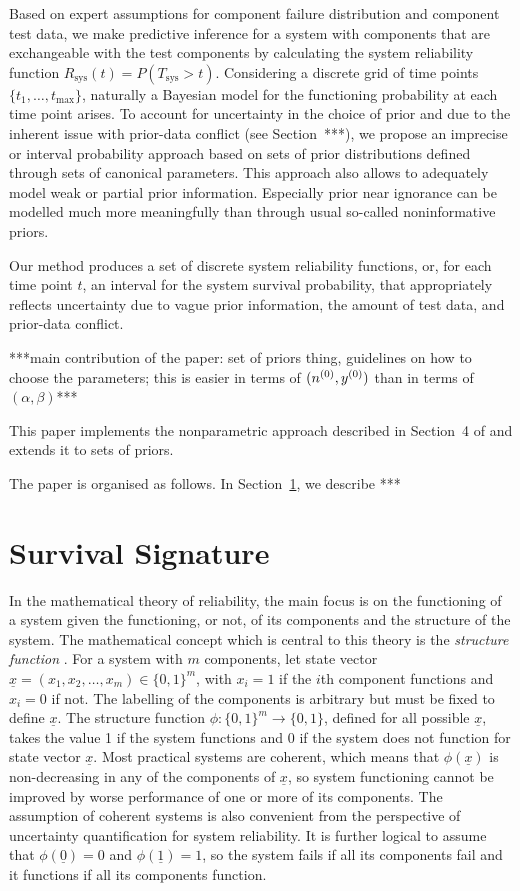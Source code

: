 \documentclass[12pt, a4paper]{elsarticle}
\newcommand{\Rsys}{R_\text{sys}}
\def\Tsys{T_\text{sys}}
\def\tmax{t_\text{max}}
\begin{document}
Based on expert assumptions for component failure distribution and component test data,
we make predictive inference for a system with components that are exchangeable
with the test components by calculating the system reliability function $\Rsys(t) = P(\Tsys > t)$.
Considering a discrete grid of time points $\{t_1, \ldots, \tmax\}$,
naturally a Bayesian model for the functioning probability at each time point arises.
To account for uncertainty in the choice of prior and due to the inherent issue with prior-data conflict (see Section~***),
we propose an imprecise or interval probability approach
based on sets of prior distributions defined through sets of canonical parameters.
This approach also allows to adequately model weak or partial prior information.
Especially prior near ignorance can be modelled much more meaningfully than through usual so-called noninformative priors. 

Our method produces a set of discrete system reliability functions,
or, for each time point $t$, an interval for the system survival probability,
that appropriately reflects uncertainty due to vague prior information, the amount of test data, and prior-data conflict.

***main contribution of the paper:
set of priors thing,
guidelines on how to choose the parameters;
this is easier in terms of $(n^{(0)}, y^{(0)})$ than in terms of $(\alpha, \beta)$***

This paper implements the nonparametric approach described in Section~4 of \citet{2015:bayessurvsign}
and extends it to sets of priors.

The paper is organised as follows.
In Section~\ref{sec:survsign}, we describe ***


\section{Survival Signature}
\label{sec:survsign}

In the mathematical theory of reliability, the main focus is on the functioning of a system given the functioning, or not, 
of its components and the structure of the system. The mathematical concept which is central to this theory is the 
\emph{structure function} \citep{BP75}. For a system with $m$ components, let state vector 
$\underline{x} = (x_1,x_2,\ldots,x_m) \in \{0,1\}^m$, with $x_i=1$ if the $i$th component functions 
and $x_i=0$ if not. The labelling of the components is arbitrary but must be fixed to define $\underline{x}$. 
The structure function $\phi : \{0,1\}^m \rightarrow \{0,1\}$, defined for all possible $\underline{x}$, takes 
the value 1 if the system functions and 0 if the system does not function for state vector $\underline{x}$. 
Most practical systems are coherent, which means that $\phi(\underline{x})$ 
is non-decreasing in any of the components of $\underline{x}$, so system functioning cannot be improved by worse performance 
of one or more of its components. The assumption of coherent systems is also convenient from the perspective of uncertainty
quantification for system reliability. It is further logical to assume that $\phi(\underline{0})=0$ and $\phi(\underline{1})=1$, 
so the system fails if all its components fail and it functions if all its components function. 
\end{document}
